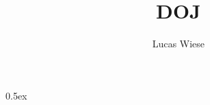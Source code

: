 \documentclass[11pt,a4paper]{article}
\begin{document}
\title{DOJ}
\author{Lucas Wiese}
\maketitle

\tableofcontents

\parindent 0pt\parskip 0.5ex



%
%
\end{document}
